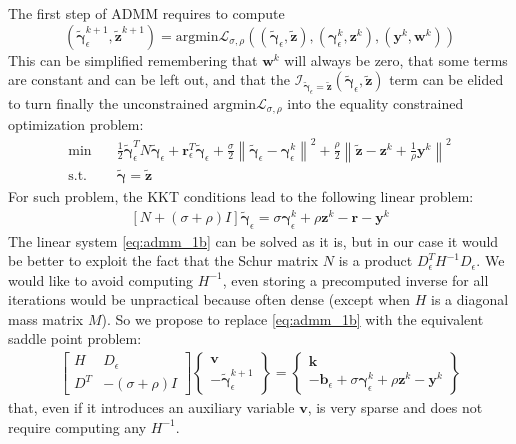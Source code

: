 \documentclass{svproc}
\newcommand{\vect}[1]{\bm{#1}}
\newcommand{\norm}[1]{\left\lVert#1\right\rVert}
\begin{document}
The first step of ADMM requires to compute 
\[
(\tilde{\vect{\gamma}}_\epsilon^{k+1},\tilde{\vect{z}}^{k+1}) = \text{argmin} \mathcal{L}_{\sigma,\rho} \left((\tilde{\vect{\gamma}}_\epsilon,\tilde{\vect{z}}),(\vect{\gamma}_\epsilon^k,\vect{z}^k),(\vect{y}^k,\vect{w}^k)\right)
\] 
This can be simplified remembering that $\vect{w}^k$ will always be zero, that some terms are constant and can be left out, and that the $\mathcal{I}_{\tilde{\vect{\gamma}}_\epsilon = \tilde{\vect{z}}}(\tilde{\vect{\gamma}}_\epsilon,\tilde{\vect{z}})$ term can be elided to turn finally the unconstrained $\text{argmin}\mathcal{L}_{\sigma,\rho}$ into the equality constrained optimization problem:
\begin{subequations}
	\begin{align}
    \text{min} \quad  &  \frac{1}{2} \tilde{\vect{\gamma}}_\epsilon^T N \tilde{\vect{\gamma}}_\epsilon + \vect{r}^T_\epsilon \tilde{\vect{\gamma}}_\epsilon  
+ \frac{\sigma}{2} \norm{\tilde{\vect{\gamma}}_\epsilon - \vect{\gamma}_\epsilon^k}^2
+ \frac{\rho}{2} \norm{\tilde{\vect{z}} - \vect{z}^k + \frac{1}{\rho} \vect{y}^k}^2 \\
	  \text{s.t.} \quad &  \tilde{\vect{\gamma}} = \tilde{\vect{z}}
	\end{align}
	\label{eq:admm_1a}
\end{subequations}
%
For such problem, the KKT conditions lead to the following linear problem:
\begin{align}
    \left[ N + (\sigma+\rho) I \right] \tilde{\vect{\gamma}}_\epsilon = \sigma \vect{\gamma}_\epsilon^k + \rho \vect{z}^k - \vect{r} - \vect{y}^k
		\label{eq:admm_1b}
\end{align}
%
The linear system \eqref{eq:admm_1b} can be solved as it is, but in our case it would be better to exploit the fact that the Schur matrix $N$ is a product $D_\epsilon^T H^{-1} D_\epsilon$. We would like to avoid computing $H^{-1}$, even storing a precomputed inverse for all iterations would be unpractical because often dense (except when $H$ is a diagonal mass matrix $M$). So we propose to replace \eqref{eq:admm_1b} with the equivalent saddle point problem:
\begin{subequations}
	\begin{align}
    \begin{bmatrix}
		 H   & D_\epsilon \\
		 D^T & -(\sigma+\rho) I
		\end{bmatrix}
		\begin{Bmatrix}
		 \vect{v}    \\
		 -\tilde{\vect{\gamma}}_\epsilon^{k+1} 
		\end{Bmatrix}
		=
		\begin{Bmatrix}
		 \vect{k} \\
		 -\vect{b}_\epsilon + \sigma \vect{\gamma}_\epsilon^k + \rho \vect{z}^k -\vect{y}^k 
		\end{Bmatrix}
	\end{align}
	\label{eq:admm_1c}
\end{subequations}
that, even if it introduces an auxiliary variable $\vect{v}$, is very sparse and does not require computing any $H^{-1}$.
\end{document}
